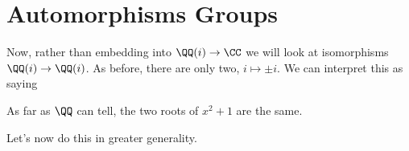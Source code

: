 %

\section{Automorphisms Groups}
Now, rather than embedding into $\QQ(i) \to \CC$ we will look at isomorphisms $\QQ(i) \to \QQ(i)$.
As before, there are only two, $i \mapsto \pm i$.
We can interpret this as saying
\begin{moral}
As far as $\QQ$ can tell, the two roots of $x^2+1$ are the same.
\end{moral}
Let's now do this in greater generality.

